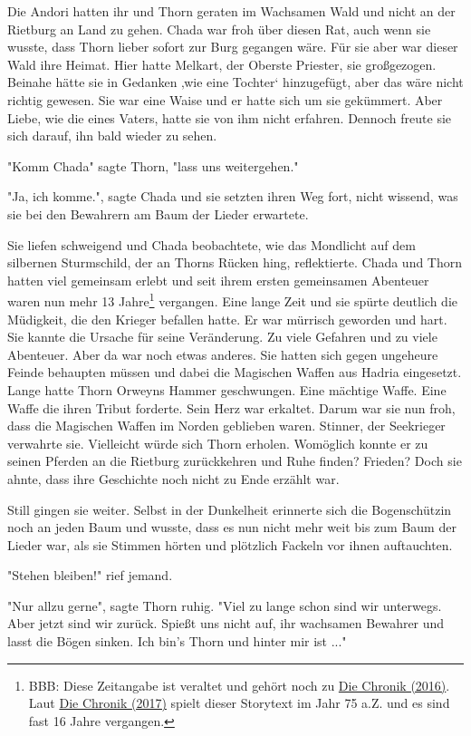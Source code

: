\documentclass[10pt, a4paper, oneside]{book}
\newcommand{\refprodukt}[1]{\hyperref[Produkt: #1]{#1}}
\begin{document}
\begin{multicols}{2}
Die Andori hatten ihr und Thorn geraten im Wachsamen Wald und nicht an der Rietburg an Land zu gehen. Chada war froh über diesen Rat, auch wenn sie wusste, dass Thorn lieber sofort zur Burg gegangen wäre. Für sie aber war dieser Wald ihre Heimat. Hier hatte Melkart, der Oberste Priester, sie großgezogen. Beinahe hätte sie in Gedanken ‚wie eine Tochter‘ hinzugefügt, aber das wäre nicht richtig gewesen. Sie war eine Waise und er hatte sich um sie gekümmert. Aber Liebe, wie die eines Vaters, hatte sie von ihm nicht erfahren. Dennoch freute sie sich darauf, ihn bald wieder zu sehen.

"Komm Chada" sagte Thorn, "lass uns weitergehen."

"Ja, ich komme.", sagte Chada und sie setzten ihren Weg fort, nicht wissend, was sie bei den Bewahrern am Baum der Lieder erwartete.

Sie liefen schweigend und Chada beobachtete, wie das Mondlicht auf dem silbernen Sturmschild, der an Thorns Rücken hing, reflektierte. Chada und Thorn hatten viel gemeinsam erlebt und seit ihrem ersten gemeinsamen Abenteuer waren nun mehr 13 Jahre\footnote{BBB: Diese Zeitangabe ist veraltet und gehört noch zu \refprodukt{Die Chronik (2016)}. Laut \refprodukt{Die Chronik (2017)} spielt dieser Storytext im Jahr 75 a.Z. und es sind fast 16 Jahre vergangen.} vergangen. Eine lange Zeit und sie spürte deutlich die Müdigkeit, die den Krieger befallen hatte. Er war mürrisch geworden und hart. Sie kannte die Ursache für seine Veränderung. Zu viele Gefahren und zu viele Abenteuer. Aber da war noch etwas anderes. Sie hatten sich gegen ungeheure Feinde behaupten müssen und dabei die Magischen Waffen aus Hadria eingesetzt. Lange hatte Thorn Orweyns Hammer geschwungen. Eine mächtige Waffe. Eine Waffe die ihren Tribut forderte. Sein Herz war erkaltet. Darum war sie nun froh, dass die Magischen Waffen im Norden geblieben waren. Stinner, der Seekrieger verwahrte sie. Vielleicht würde sich Thorn erholen. Womöglich konnte er zu seinen Pferden an die Rietburg zurückkehren und Ruhe finden? Frieden? Doch sie ahnte, dass ihre Geschichte noch nicht zu Ende erzählt war.

Still gingen sie weiter. Selbst in der Dunkelheit erinnerte sich die Bogenschützin noch an jeden Baum und wusste, dass es nun nicht mehr weit bis zum Baum der Lieder war, als sie Stimmen hörten und plötzlich Fackeln vor ihnen auftauchten.

"Stehen bleiben!" rief jemand.

"Nur allzu gerne", sagte Thorn ruhig. "Viel zu lange schon sind wir unterwegs. Aber jetzt sind wir zurück. Spießt uns nicht auf, ihr wachsamen Bewahrer und lasst die Bögen sinken. Ich bin’s Thorn und hinter mir ist ..."


\end{multicols}
\end{document}
